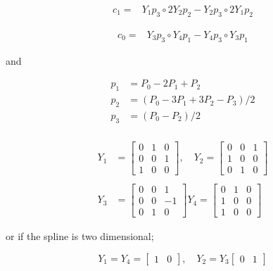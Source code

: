 \documentclass{article}
\begin{document}
  \begin{equation}
 \begin{aligned}
 c_1 =& Y_1p_3\circ 2 Y_2 p_2 - Y_2 p_3\circ 2 Y_1 p_2
 \end{aligned}
 \end{equation}
 
 \begin{equation}
 \begin{aligned}
 c_0 =& Y_3p_3\circ Y_4p_1  -  Y_4p_3\circ Y_3p_1
 \end{aligned}
 \end{equation}

and 

\begin{equation}
\begin{aligned}
    p_1 &= P_0-2P_1+P_2 \\
    p_2 &= (P_0-3P_1+3P_2-P_3)/2 \\
    p_3 &= (P_0 - P_2)/2\\
\end{aligned}
\end{equation}

\begin{equation}
\begin{aligned}
    Y_1 &= \begin{bmatrix}
     0 & 1 & 0 \\ 0 & 0 & 1 \\ 1 & 0 & 0
    \end{bmatrix}, \quad  Y_2 = \begin{bmatrix}
     0 & 0 & 1 \\ 1 & 0 & 0 \\ 0 & 1 & 0
    \end{bmatrix} \\\\ Y_3 &= \begin{bmatrix}
     0 & 0 & 1 \\ 0 & 0 & -1 \\ 0 & 1 & 0
    \end{bmatrix}
      Y_4 = \begin{bmatrix}
     0 & 1 & 0 \\ 1 & 0 & 0 \\ 1 & 0 & 0
    \end{bmatrix}
\end{aligned}
\end{equation}

or if the spline is two dimensional;

\begin{equation}
    Y_1 = Y_4 = \begin{bmatrix} 1 & 0
    \end{bmatrix}, \quad  Y_2 = Y_3  \begin{bmatrix}0 & 1
    \end{bmatrix}
\end{equation}
\end{document}
